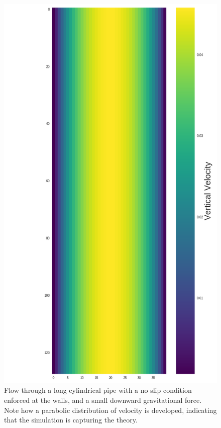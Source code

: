 \documentclass[]{article}
\begin{document}
\begin{figure}
	\centering
	\includegraphics[height=.8\textwidth]{figures/pois_flow.png}
	\caption{Flow through a long cylindrical pipe with a no slip condition enforced at the walls, and a small downward gravitational force. Note how a parabolic distribution of velocity is developed, indicating that the simulation is capturing the theory.}
	\label{fig:pois_flow}
\end{figure}
\end{document}
